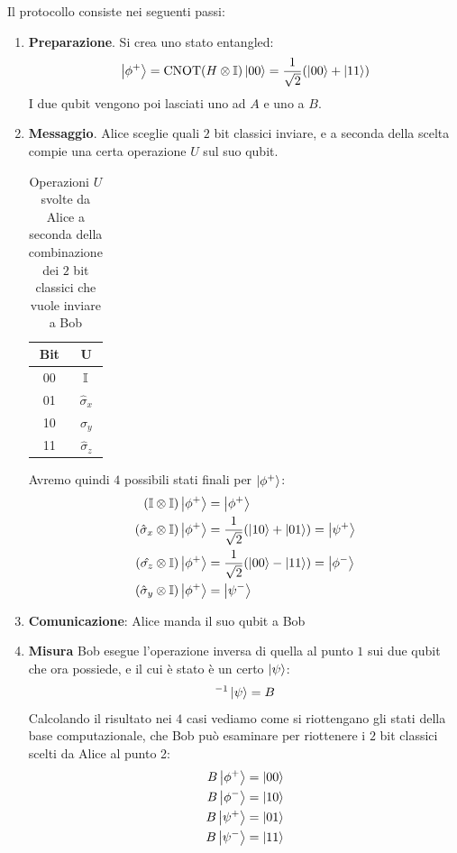 \documentclass[../../InformazioneQuantistica.tex]{subfiles}
\begin{document}
Il protocollo consiste nei seguenti passi:
\begin{enumerate}
\item \textbf{Preparazione}. Si crea uno stato entangled:
\begin{align*}
\Ket{\phi^+} = \operatorname{CNOT}(H\otimes \mathbb{I})\Ket{00} = \frac{1}{\sqrt{2}}(\Ket{00}+\Ket{11})
\end{align*}
I due qubit vengono poi lasciati uno ad $A$ e uno a $B$.
\item \textbf{Messaggio}. Alice sceglie quali $2$ bit classici inviare, e a seconda della scelta compie una certa operazione $U$ sul suo qubit.

\begin{table}[H]
\centering
\begin{tabular}{cc}
\toprule
\textbf{Bit} & $\bm{U}$ \\ \midrule
00 & $\mathbb{I}$\\
01 & $\hat{\sigma}_x$\\
10 & $\hat{\sigma}_y$\\
11 & $\hat{\sigma}_z$ \\ \bottomrule
\end{tabular}
\caption{Operazioni $U$ svolte da Alice a seconda della combinazione dei $2$ bit classici che vuole inviare a Bob}
\end{table}

Avremo quindi $4$ possibili stati finali per $\Ket{\phi^+}$:
\begin{align*}
(\mathbb{I}\otimes \mathbb{I}) \Ket{\phi^+} &= \Ket{\phi^+}\\
(\hat{\sigma}_x \otimes \mathbb{I}) \Ket{\phi^+} &= \frac{1}{\sqrt{2}} (\Ket{10}+\Ket{01}) = \Ket{\psi^+}\\
(\hat{\sigma_z} \otimes \mathbb{I}) \Ket{\phi^+} &= \frac{1}{\sqrt{2}}(\Ket{00}-\Ket{11}) = \Ket{\phi^-}\\
(\hat{\sigma}_y \otimes \mathbb{I}) \Ket{\phi^+} &= \Ket{\psi^-}
\end{align*}

\item \textbf{Comunicazione}: Alice manda il suo qubit a Bob
\item \textbf{Misura} Bob esegue l'operazione inversa di quella al punto $1$ sui due qubit che ora possiede, e il cui è stato è un certo $\Ket{\psi}$:
\begin{align*}
[\op{CNOT}(H \otimes \bb{I})]^{-1} \ket{\psi} = B
\end{align*}
Calcolando il risultato nei $4$ casi vediamo come si riottengano gli stati della base computazionale, che Bob può esaminare per riottenere i $2$ bit classici scelti da Alice al punto 2:
\begin{align*}
B \Ket{\phi^+} &= \Ket{00}\\
B \Ket{\phi^-} &= \Ket{10}\\
B\Ket{\psi^+} &= \Ket{01}\\
B\Ket{\psi^-} &= \Ket{11}
\end{align*}
\end{enumerate}
\end{document}
